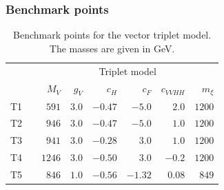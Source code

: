 \subsubsection{Benchmark points}

\begin{table}
    \begin{tabular}{c c rrrrrr}
      \toprule
      \multirow{2}{*}{}
      && \multicolumn{6}{c}{Triplet model} \\
      \cmidrule{3-8}
      && $M_V$ & $g_V$ & $c_H$ & ${c}_{F}$ & ${c}_{VVHH}$ & $m_\xi$ \\
      \midrule
      T1 && $591$ & $3.0$ & $-0.47$ & $-5.0$ & $2.0$ & $1200$ \\
      T2 && $946$ & $3.0$ & $-0.47$ & $-5.0$ & $1.0$ & $1200$ \\
      T3 && $941$ & $3.0$ & $-0.28$ & $3.0$ & $1.0$ & $1200$ \\
      T4 && $1246$ & $3.0$ & $-0.50$ & $3.0$ & $-0.2$ & $1200$ \\
      T5 && $846$ & $1.0$ & $-0.56$ & $-1.32$ & $0.08$ & $849$ \\
      \bottomrule
    \end{tabular}
    \caption[Benchmark points for the vector triplet model]{Benchmark points
      for the vector triplet model. The masses are given in GeV.}
  \label{tbl:validity_vector_triplet_benchmarks}
\end{table}


